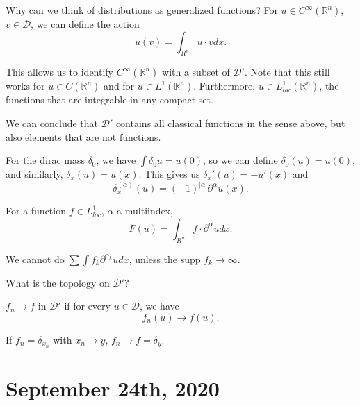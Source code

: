 \documentclass[11pt]{scrartcl}
\newcommand{\R}{\mathbb{R}}
\newcommand{\supp}{\text{supp }}
\begin{document}
Why can we think of distributions as generalized functions?  For $u \in C^{\infty}(\R^n)$, $v \in \mathcal D$, we can define the action
$$u(v) = \int_{R^n} u\cdot v dx.$$

This allows us to identify $C^{\infty}(\R^n)$ with a subset of $\mathcal D'$.  Note that this still works for $u \in C(\R^n)$ and for $u \in L^1(\R^n)$.  Furthermore, $u \in L_{loc}^1(\R^n)$, the functions that are integrable in any compact set.

We can conclude that $\mathcal D'$ contains all classical functions in the sense above, but also elements that are not functions.

\begin{example} For the dirac mass $\delta_0$, we have $\int \delta_0 u = u(0)$, so we can define $\delta_0(u) = u(0)$, and similarly, $\delta_x(u) = u(x)$.  This gives us $\delta_x'(u) = -u'(x)$ and 
$$\delta_x^(\alpha)(u) = (-1)^{|\alpha|}\partial^{\alpha} u(x).$$
\end{example}

\begin{example} For a function $f \in L_{loc}^1$, $\alpha$ a multiindex,
$$F(u) = \int_{R^n} f \cdot \partial^{\alpha} u dx.$$

We cannot do $\sum \int f_k \partial^{\alpha_k} u dx$, unless the $\supp f_k \rightarrow \infty$.
\end{example}

What is the topology on $\mathcal D'$?  
\begin{definition} $f_n \rightarrow f$ in $\mathcal D'$ if for every $u \in \mathcal D$, we have 
$$f_n(u) \rightarrow f(u).$$
\end{definition}
\begin{example} If $f_n = \delta_{x_n}$ with $x_n \rightarrow y$, $f_n \rightarrow f = \delta_y$. 
\end{example}
\pagebreak
\section{September 24th, 2020}
\end{document}
